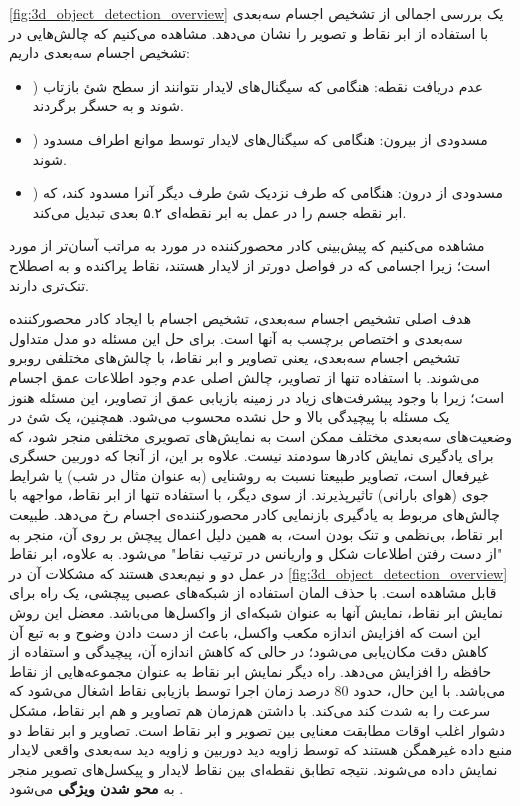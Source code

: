 \cref{fig:3d_object_detection_overview} یک بررسی اجمالی از تشخیص اجسام سه‌بعدی با استفاده از ابر نقاط و تصویر را نشان می‌دهد.
مشاهده می‌کنیم که چالش‌هایی در تشخیص اجسام سه‌بعدی داریم:
\begin{itemize}
    \item {}) عدم دریافت نقطه:‌ هنگامی که سیگنال‌های لایدار نتوانند از سطح شئ بازتاب شوند و به حسگر برگردند.
    \item {}) مسدودی از بیرون:‌ هنگامی که سیگنال‌های لایدار توسط موانع اطراف مسدود شوند.
    \item {}) مسدودی از درون: هنگامی که طرف نزدیک شئ طرف دیگر آنرا مسدود کند، که ابر نقطه جسم را در عمل به ابر نقطه‌ای ۵.۲ بعدی تبدیل می‌کند. 
\end{itemize}
مشاهده می‌کنیم که پیش‌بینی کادر محصورکننده‌ در مورد  به مراتب آسان‌تر از مورد  است؛ زیرا اجسامی که در فواصل دورتر از لایدار هستند، نقاط پراکنده و به اصطلاح تنک‌تری دارند.

هدف اصلی تشخیص اجسام سه‌بعدی، تشخیص اجسام با ایجاد کادر محصور‌کننده سه‌بعدی و اختصاص برچسب به آنها است. برای حل این مسئله دو مدل متداول تشخیص اجسام سه‌بعدی، یعنی تصاویر و ابر نقاط، با چالش‌های مختلفی روبرو می‌شوند. با استفاده تنها از تصاویر، چالش اصلی عدم وجود اطلاعات عمق اجسام است؛ زیرا با وجود پیشرفت‌های زیاد در زمینه بازیابی عمق از تصاویر، این مسئله هنوز یک مسئله با پیچیدگی بالا و حل نشده محسوب می‌شود. همچنین، یک شئ در وضعیت‌های سه‌بعدی مختلف ممکن است به نمایش‌های تصویری مختلفی منجر شود، که برای یادگیری نمایش کادرها سودمند نیست. علاوه بر این، از آنجا که دوربین حسگری غیرفعال است، تصاویر طبیعتا نسبت به روشنایی (به عنوان مثال در شب) یا شرایط جوی (هوای بارانی) تاثیرپذیرند. از سوی دیگر، با استفاده تنها از ابر نقاط، مواجهه با چالش‌های مربوط به یادگیری بازنمایی کادر محصورکننده‌ی اجسام رخ می‌دهد. طبیعت ابر نقاط، بی‌نظمی و تنک بودن است، به همین دلیل اعمال پیچش بر روی آن، منجر به "از دست رفتن اطلاعات شکل و واریانس در ترتیب نقاط" می‌شود. به علاوه، ابر نقاط در عمل دو و نیم‌بعدی هستند که مشکلات آن در \cref{fig:3d_object_detection_overview} قابل مشاهده است. با حذف المان استفاده از شبکه‌های عصبی پیچشی، یک راه برای نمایش ابر نقاط، نمایش آنها به عنوان شبکه‌ای از واکسل‌ها می‌باشد. معضل این روش این است که افزایش اندازه مکعب واکسل، باعث از دست دادن وضوح و به تبع آن کاهش دقت مکان‌یابی می‌شود؛ در حالی که کاهش اندازه آن، پیچیدگی و استفاده از حافظه را افزایش می‌دهد. راه دیگر نمایش ابر نقاط به عنوان مجموعه‌هایی از نقاط می‌باشد. با این حال، حدود 80 درصد زمان اجرا توسط بازیابی نقاط اشغال می‌شود که سرعت را به شدت کند می‌کند. با داشتن هم‌زمان هم تصاویر و هم ابر نقاط، مشکل دشوار اغلب اوقات مطابقت معنایی بین تصویر و ابر نقاط است. تصاویر و ابر نقاط دو منبع داده غیرهمگن هستند که توسط زاویه دید دوربین و زاویه دید سه‌بعدی واقعی لایدار نمایش داده می‌شوند. نتیجه تطابق نقطه‌ای بین نقاط لایدار و پیکسل‌های تصویر منجر به \textbf{محو شدن ویژگی} می‌شود \cite{qian20223d}.

